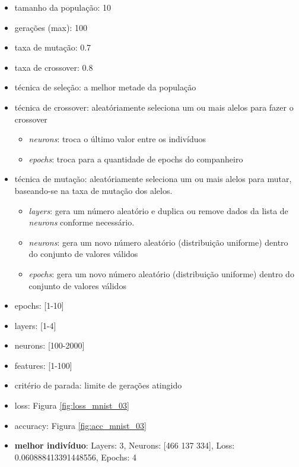\documentclass[twoside,conference,a4paper]{IEEEtran}
\begin{document}
\begin{itemize}
    \item tamanho da população: 10
    \item gerações (max): 100
    \item taxa de mutação: 0.7
    \item taxa de crossover: 0.8
    \item técnica de seleção: a melhor metade da população
    \item técnica de crossover: aleatóriamente seleciona um ou mais alelos para fazer o crossover
    \begin{itemize}
        \item \emph{neurons}: troca o último valor entre os indivíduos
        \item \emph{epochs}: troca para a quantidade de epochs do companheiro
    \end{itemize}
    \item técnica de mutação: aleatóriamente seleciona um ou mais alelos para mutar, baseando-se na taxa de mutação dos alelos.
    \begin{itemize}
        \item \emph{layers}: gera um número aleatório e duplica ou remove dados da lista de \emph{neurons} conforme necessário.
        \item \emph{neurons}: gera um novo número aleatório (distribuição uniforme) dentro do conjunto de valores válidos
        \item \emph{epochs}: gera um novo número aleatório (distribuição uniforme) dentro do conjunto de valores válidos
    \end{itemize}
    \item epochs: [1-10]
    \item layers: [1-4]
    \item neurons: [100-2000]
    \item features: [1-100]
    \item critério de parada: limite de gerações atingido
    \item loss: Figura \ref{fig:loss_mnist_03}
    \item accuracy: Figura \ref{fig:acc_mnist_03}
    \item \textbf{melhor indivíduo}: Layers: 3, Neurons: [466 137 334], Loss: 0.060888413391448556, Epochs: 4
\end{itemize}
\end{document}
